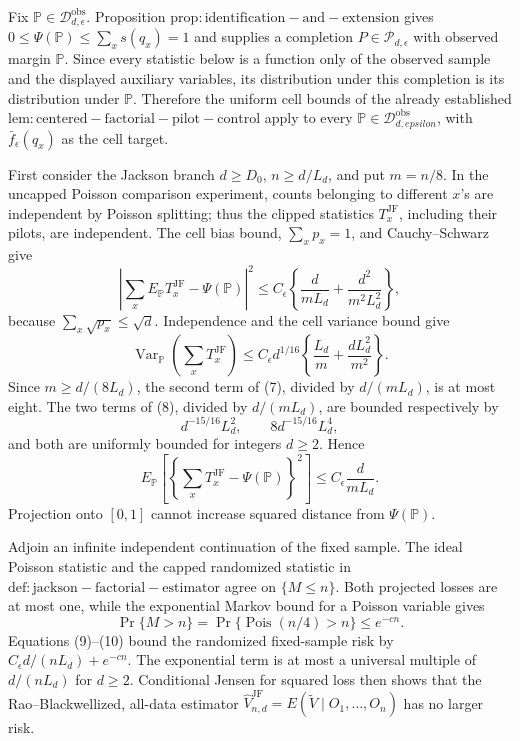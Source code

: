 Fix \(\mathbb P\in\mathcal D_{d,\epsilon}^{\mathrm{obs}}\).  Proposition \(\mathrm{prop:identification-and-extension}\) gives \(0\leq\Psi(\mathbb P)\leq\sum_xs(q_x)=1\) and supplies a completion \(P\in\mathcal P_{d,\epsilon}\) with observed margin \(\mathbb P\).  Since every statistic below is a function only of the observed sample and the displayed auxiliary variables, its distribution under this completion is its distribution under \(\mathbb P\).  Therefore the uniform cell bounds of the already established \(\mathrm{lem:centered-factorial-pilot-control}\) apply to every \(\mathbb P\in\mathcal D_{d,epsilon}^{\mathrm{obs}}\), with \(\bar f_\epsilon(q_x)\) as the cell target.

First consider the Jackson branch \(d\geq D_0\), \(n\geq d/L_d\), and put \(m=n/8\).  In the uncapped Poisson comparison experiment, counts belonging to different \(x\)'s are independent by Poisson splitting; thus the clipped statistics \(T_x^{\mathrm{JF}}\), including their pilots, are independent.  The cell bias bound, \(\sum_xp_x=1\), and Cauchy--Schwarz give
\[
 \left|\sum_xE_{\mathbb P}T_x^{\mathrm{JF}}-\Psi(\mathbb P)\right|^2
 \leq C_\epsilon\left\{\frac d{mL_d}+\frac{d^2}{m^2L_d^2}\right\}, \tag{7}
\]
because \(\sum_x\sqrt{p_x}\leq\sqrt d\).  Independence and the cell variance bound give
\[
 \operatorname{Var}_{\mathbb P}\left(\sum_xT_x^{\mathrm{JF}}\right)
 \leq C_\epsilon d^{1/16}
 \left\{\frac{L_d}{m}+\frac{dL_d^2}{m^2}\right\}.                 \tag{8}
\]
Since \(m\geq d/(8L_d)\), the second term of (7), divided by \(d/(mL_d)\), is at most eight.  The two terms of (8), divided by \(d/(mL_d)\), are bounded respectively by
\[
 d^{-15/16}L_d^2,\qquad 8d^{-15/16}L_d^4,
\]
and both are uniformly bounded for integers \(d\geq2\).  Hence
\[
 E_{\mathbb P}\left[\left\{\sum_xT_x^{\mathrm{JF}}-\Psi(\mathbb P)\right\}^2\right]
 \leq C_\epsilon\frac d{mL_d}.                                    \tag{9}
\]
Projection onto \([0,1]\) cannot increase squared distance from \(\Psi(\mathbb P)\).

Adjoin an infinite independent continuation of the fixed sample.  The ideal Poisson statistic and the capped randomized statistic in \(\mathrm{def:jackson-factorial-estimator}\) agree on \(\{M\leq n\}\).  Both projected losses are at most one, while the exponential Markov bound for a Poisson variable gives
\[
 \Pr\{M>n\}=\Pr\{\operatorname{Pois}(n/4)>n\}\leq e^{-c n}.       \tag{10}
\]
Equations (9)--(10) bound the randomized fixed-sample risk by \(C_\epsilon d/(nL_d)+e^{-cn}\).  The exponential term is at most a universal multiple of \(d/(nL_d)\) for \(d\geq2\).  Conditional Jensen for squared loss then shows that the Rao--Blackwellized, all-data estimator \(\widehat V_{n,d}^{\mathrm{JF}}=E(\widetilde V\mid O_1,\ldots,O_n)\) has no larger risk.

